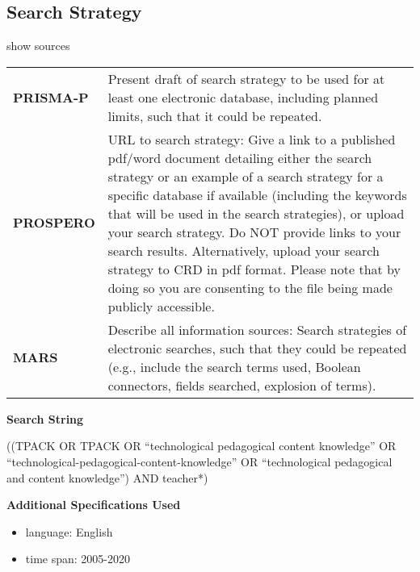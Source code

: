 \documentclass[
]{article}
\providecommand{\tightlist}{%
  \setlength{\itemsep}{0pt}\setlength{\parskip}{0pt}}
\begin{document}
\hypertarget{search-strategy}{%
\subsection{Search Strategy}\label{search-strategy}}

show sources

\hypertarget{searchs}{}
\begin{collapse}

\begin{table}[H]
\centering
\begin{tabular}{>{}l|l}
\hline
\cellcolor[HTML]{ececec}{source} & \cellcolor[HTML]{ececec}{description}\\
\hline
\textbf{PRISMA-P} & Present draft of search strategy to be used for at least one electronic database, including planned limits, such that it could be repeated.\\
\hline
\textbf{PROSPERO} & URL to search strategy: Give a link to a published pdf/word document detailing either the search strategy or an example of a search strategy for a specific database if available (including the keywords that will be used in the search strategies), or upload your search strategy. Do NOT provide links to your search results. Alternatively, upload your search strategy to CRD in pdf format. Please note that by doing so you are consenting to the file being made publicly accessible.\\
\hline
\textbf{MARS} & Describe all information sources: Search strategies of electronic searches, such that they could be repeated (e.g., include the search terms used, Boolean connectors, fields searched, explosion of terms).\\
\hline
\end{tabular}
\end{table}

\end{collapse}

\textbf{Search String}

((TPACK OR TPACK OR ``technological pedagogical content knowledge'' OR
``technological-pedagogical-content-knowledge'' OR ``technological
pedagogical and content knowledge'') AND teacher*)

\textbf{Additional Specifications Used}

\begin{itemize}
\tightlist
\item
  language: English
\item
  time span: 2005-2020
\end{itemize}
\end{document}
